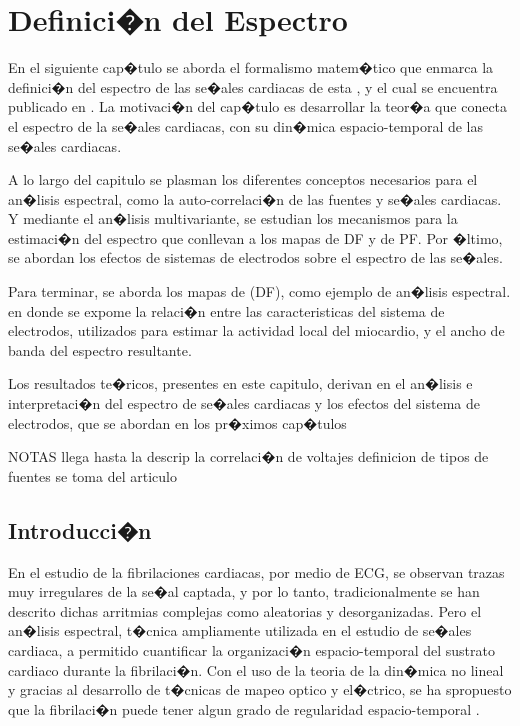 \chapter{Definici�n  del Espectro}



\begin{resumen}

En el siguiente cap�tulo se aborda el formalismo matem�tico que enmarca la
definici�n del espectro de las se�ales cardiacas de esta \nombreDoc, y el cual
se encuentra publicado en \cite{Requena13b}. La motivaci�n del cap�tulo es
desarrollar la teor�a que conecta el espectro de la se�ales cardiacas, con su
din�mica espacio-temporal de las se�ales cardiacas. 

A lo largo del capitulo se plasman los diferentes conceptos necesarios para el
an�lisis espectral, como la auto-correlaci�n de las fuentes y  se�ales
cardiacas. Y mediante el an�lisis multivariante, se estudian los mecanismos para
la estimaci�n del espectro que conllevan a los mapas de \acf{DF} y de \acf{PF}.
Por �ltimo, se abordan los efectos de sistemas de electrodos sobre el espectro
de las se�ales.


Para terminar, se aborda los mapas de (\ac{DF}), como ejemplo de an�lisis
espectral. en donde se expome la relaci�n entre las caracteristicas del sistema
de electrodos, utilizados para estimar la actividad local del miocardio, y el
ancho de banda del espectro resultante.

Los resultados te�ricos, presentes en este capitulo, derivan en el an�lisis e
interpretaci�n del espectro de se�ales cardiacas y los efectos del sistema
de electrodos, que se abordan en los pr�ximos cap�tulos





NOTAS llega hasta la descrip la correlaci�n de voltajes  definicion de tipos de
fuentes se toma del articulo

\end{resumen}


\section{Introducci�n}

En el estudio de la fibrilaciones cardiacas, por medio de \ac{ECG}, se observan
trazas muy irregulares de la se�al captada, y por lo tanto, tradicionalmente se
han descrito dichas arritmias complejas como aleatorias  y desorganizadas.
Pero el an�lisis espectral, t�cnica ampliamente utilizada en el estudio de
se�ales cardiaca, a permitido cuantificar la organizaci�n espacio-temporal del
sustrato cardiaco durante la fibrilaci�n. Con el uso de la teoria de la din�mica
no lineal y gracias al desarrollo de t�cnicas de mapeo optico y el�ctrico, se ha
spropuesto que la fibrilaci�n puede tener algun grado de regularidad
espacio-temporal \cite{Hoekstra95, Jalife00}.


